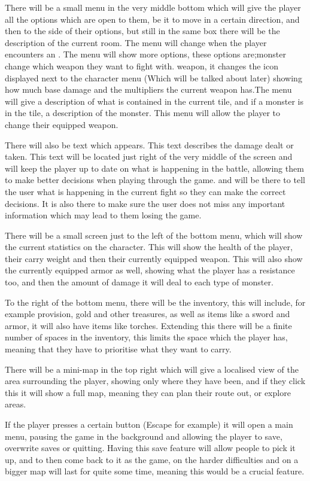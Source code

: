 \documentclass[12pt]{article}
\begin{document}
There will be a small menu in the very middle bottom which will give the player all the options which are open to them, be it to move in a certain direction, and then to the side of their options, but still in the same box there will be the description of the current room. The menu will change when the player encounters an . The menu will show more options, these options are;monster change which weapon they want to fight with. weapon, it changes the icon displayed next to the character menu (Which will be talked about later) showing how much base damage and the multipliers the current weapon has.The menu will give a description of what is contained in the current tile, and if a monster is in the tile, a description of the monster. This menu will allow the player to change their equipped weapon.

There will also be text which appears. This text describes the damage dealt or taken. This text will be located just right of the very middle of the screen and will keep the player up to date on what is happening in the battle, allowing them to make better decisions when playing through the game. and will be there to tell the user what is happening in the current fight so they can make the correct decisions. It is also there to make sure the user does not miss any important information which may lead to them losing the game.

There will be a small screen just to the left of the bottom menu, which will show the current statistics on the character. This will show the health of the player, their carry weight and then their currently equipped weapon. This will also show the currently equipped armor as well, showing what the player has a resistance too, and then the amount of damage it will deal to each type of monster.

To the right of the bottom menu, there will be the inventory, this will include, for example provision, gold and other treasures, as well as items like a sword and armor, it will also have items like torches. Extending this there will be a finite number of spaces in the inventory, this limits the space which the player has, meaning that they have to prioritise what they want to carry.

There will be a mini-map in the top right which will give a localised view of the area surrounding the player, showing only where they have been, and if they click this it will show a full map, meaning they can plan their route out, or explore areas.

If the player presses a certain button (Escape for example) it will open a main menu, pausing the game in the background and allowing the player to save, overwrite saves or quitting. Having this save feature will allow people to pick it up, and to then come back to it as the game, on the harder difficulties and on a bigger map will last for quite some time, meaning this would be a crucial feature.
\end{document}
